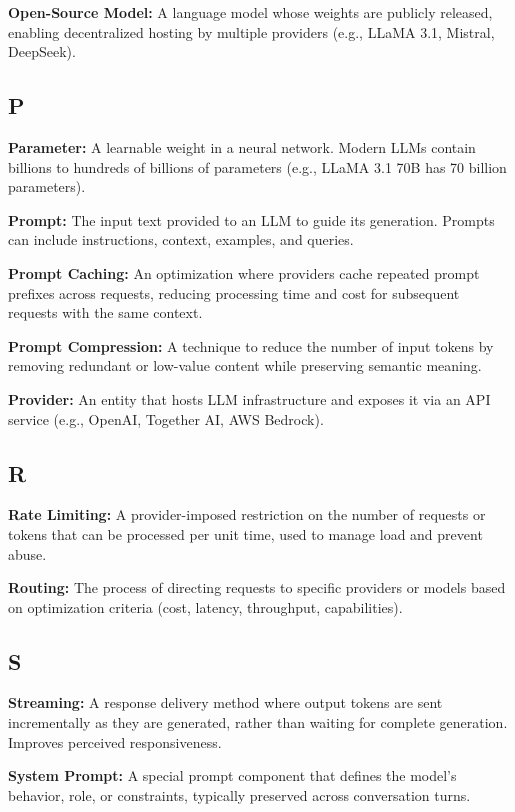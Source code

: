 \documentclass[english]{article}
\begin{document}
\textbf{Open-Source Model:} A language model whose weights are publicly released, enabling decentralized hosting by multiple providers (e.g., LLaMA 3.1, Mistral, DeepSeek).

\subsection*{P}

\textbf{Parameter:} A learnable weight in a neural network. Modern LLMs contain billions to hundreds of billions of parameters (e.g., LLaMA 3.1 70B has 70 billion parameters).

\textbf{Prompt:} The input text provided to an LLM to guide its generation. Prompts can include instructions, context, examples, and queries.

\textbf{Prompt Caching:} An optimization where providers cache repeated prompt prefixes across requests, reducing processing time and cost for subsequent requests with the same context.

\textbf{Prompt Compression:} A technique to reduce the number of input tokens by removing redundant or low-value content while preserving semantic meaning.

\textbf{Provider:} An entity that hosts LLM infrastructure and exposes it via an API service (e.g., OpenAI, Together AI, AWS Bedrock).

\subsection*{R}

\textbf{Rate Limiting:} A provider-imposed restriction on the number of requests or tokens that can be processed per unit time, used to manage load and prevent abuse.

\textbf{Routing:} The process of directing requests to specific providers or models based on optimization criteria (cost, latency, throughput, capabilities).

\subsection*{S}

\textbf{Streaming:} A response delivery method where output tokens are sent incrementally as they are generated, rather than waiting for complete generation. Improves perceived responsiveness.

\textbf{System Prompt:} A special prompt component that defines the model's behavior, role, or constraints, typically preserved across conversation turns.
\end{document}
